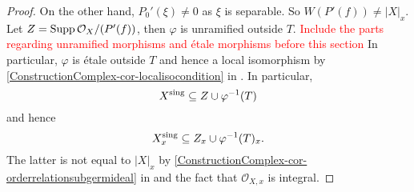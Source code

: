 \begin{proof}
    On the other hand, $P_0'(\xi)\neq 0$ as $\xi$ is separable. So $W(P'(f))\neq |X|_x$. Let $Z=\operatorname{Supp} \mathcal{O}_X/(P'(f))$, then $\varphi$ is unramified outside $T$. \textcolor{red}{Include the parts regarding unramified morphisms and étale morphisms before this section}
    In particular, $\varphi$ is étale outside $T$ and hence a local isomorphism by \cref{ConstructionComplex-cor-localisocondition} in . In particular,
    \[
        X^{\operatorname{sing}}\subseteq Z\cup\varphi^{-1}(T)  
    \]
    and hence
    \[
        X^{\operatorname{sing}}_x\subseteq Z_x\cup\varphi^{-1}(T)_x. 
    \]
    The latter is not equal to $|X|_x$ by \cref{ConstructionComplex-cor-orderrelationsubgermideal} in  and the fact that $\mathcal{O}_{X,x}$ is integral.
\end{proof}

